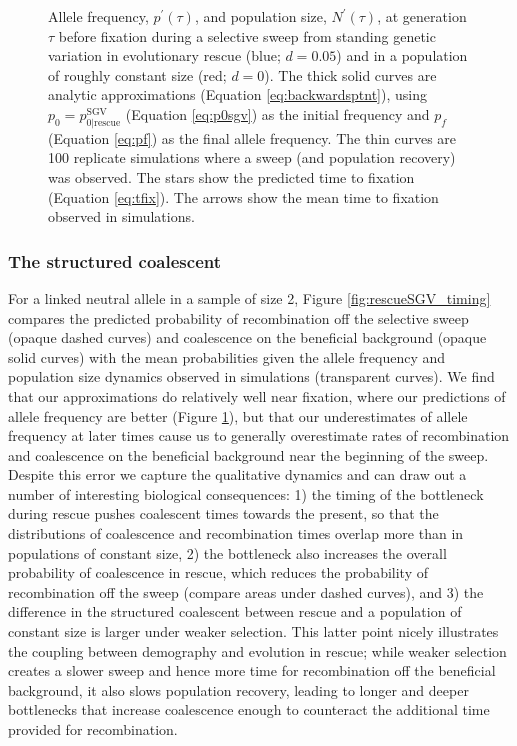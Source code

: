 \documentclass[]{article}
\begin{document}
\begin{figure}[htbp]
\caption{
Allele frequency, $p^\prime(\tau)$, and population size, $N^\prime(\tau)$, at generation $\tau$ before fixation during a selective sweep from standing genetic variation in evolutionary rescue (blue; $d=0.05$) and in a population of roughly constant size (red; $d=0$).
The thick solid curves are analytic approximations (Equation \ref{eq:backwardsptnt}), using $p_0 = p_{0|\mathrm{rescue}}^\mathrm{SGV}$ (Equation \ref{eq:p0sgv}) as the initial frequency and $p_f$ (Equation \ref{eq:pf}) as the final allele frequency.
The thin curves are 100 replicate simulations where a sweep (and population recovery) was observed.
The stars show the predicted time to fixation (Equation \ref{eq:tfix}).
The arrows show the mean time to fixation observed in simulations. 
}%
\label{fig:rescueSGV_dynamics}
\end{figure}

\subsubsection*{The structured coalescent}

For a linked neutral allele in a sample of size 2, Figure \ref{fig:rescueSGV_timing} compares the predicted probability of recombination off the selective sweep (opaque dashed curves) and coalescence on the beneficial background (opaque solid curves) with the mean probabilities given the allele frequency and population size dynamics observed in simulations (transparent curves).
We find that our approximations do relatively well near fixation, where our predictions of allele frequency are better (Figure \ref{fig:rescueSGV_dynamics}), but that our underestimates of allele frequency at later times cause us to generally overestimate rates of recombination and coalescence on the beneficial background near the beginning of the sweep.
Despite this error we capture the qualitative dynamics and can draw out a number of interesting biological consequences: 
1) the timing of the bottleneck during rescue pushes coalescent times towards the present, so that the distributions of coalescence and recombination times overlap more than in populations of constant size,
2) the bottleneck also increases the overall probability of coalescence in rescue, which reduces the probability of recombination off the sweep (compare areas under dashed curves), and
3) the difference in the structured coalescent between rescue and a population of constant size is larger under weaker selection.
This latter point nicely illustrates the coupling between demography and evolution in rescue; while weaker selection creates a slower sweep and hence more time for recombination off the beneficial background, it also slows population recovery, leading to longer and deeper bottlenecks that increase coalescence enough to counteract the additional time provided for recombination.
\end{document}
